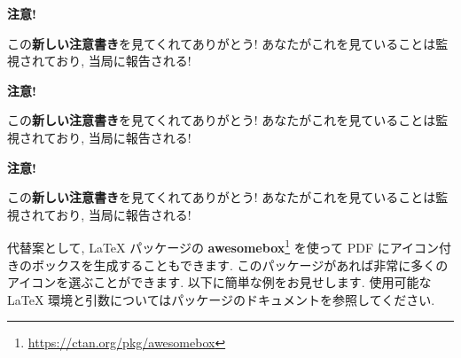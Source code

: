 \documentclass[
  11pt,
  lualatex,
  ja=standard]{bxjsreport}
\newenvironment{infobox}[1]{\begin{itemize}\renewcommand{\labelitemi}{\raisebox{-.7\height}[0pt][0pt]{%
  {\setkeys{Gin}{width=3em,keepaspectratio}\texttt{[image: \_latex/\_img/\#1]}}}}
  \setlength{\fboxsep}{1em}
  \begin{greyblock}
  \item
  }{\end{greyblock}\end{itemize}
}
\renewcommand{\href}[2]{#2\footnote{\url{#1}}}
\begin{document}
\begin{infobox}{memo}
\textbf{注意!}

この\textbf{新しい注意書き}を見てくれてありがとう! あなたがこれを見ていることは監視されており, 当局に報告される!

\end{infobox}

\begin{infobox}{important}
\textbf{注意!}

この\textbf{新しい注意書き}を見てくれてありがとう! あなたがこれを見ていることは監視されており, 当局に報告される!

\end{infobox}

\begin{infobox}{tip}
\textbf{注意!}

この\textbf{新しい注意書き}を見てくれてありがとう! あなたがこれを見ていることは監視されており, 当局に報告される!

\end{infobox}

代替案として, LaTeX パッケージの \href{https://ctan.org/pkg/awesomebox}{\textbf{awesomebox}} を使って PDF にアイコン付きのボックスを生成することもできます. このパッケージがあれば非常に多くのアイコンを選ぶことができます. 以下に簡単な例をお見せします. 使用可能な LaTeX 環境と引数についてはパッケージのドキュメントを参照してください.
\end{document}
